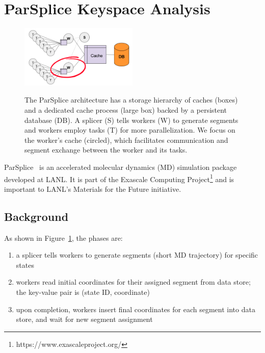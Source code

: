 \section{ParSplice Keyspace Analysis}
\label{sec:parsplice-keyspace-analysis}

\begin{figure}[t]
\noindent\includegraphics[width=0.5\textwidth]{figures/parsplice.png}\\
\caption{The ParSplice architecture has a storage hierarchy of caches (boxes) and a
dedicated cache process (large box) backed by a persistent database (DB). A splicer
(S) tells workers (W) to generate segments and workers employ tasks (T) for more
parallelization. We focus on the worker's cache (circled), which facilitates
communication and segment exchange between the worker and its tasks.
\label{fig:parsplice}}
\end{figure}

ParSplice~\cite{perez:jctc20150parsplice} is an accelerated molecular dynamics
(MD) simulation package developed at LANL. It is part of the Exascale Computing
Project\footnote{https://www.exascaleproject.org/} and is important to LANL's
Materials for the Future initiative. 

\subsection{Background}

As shown in Figure~\ref{fig:parsplice}, the phases are:

\begin{enumerate}

  \item a splicer tells workers to generate segments (short MD trajectory) for
  specific states

  \item workers read initial coordinates for their assigned segment from data
  store; the key-value pair is (state ID, coordinate)

  \item upon completion, workers insert final coordinates for each segment into
  data store, and wait for new segment assignment

\end{enumerate}

